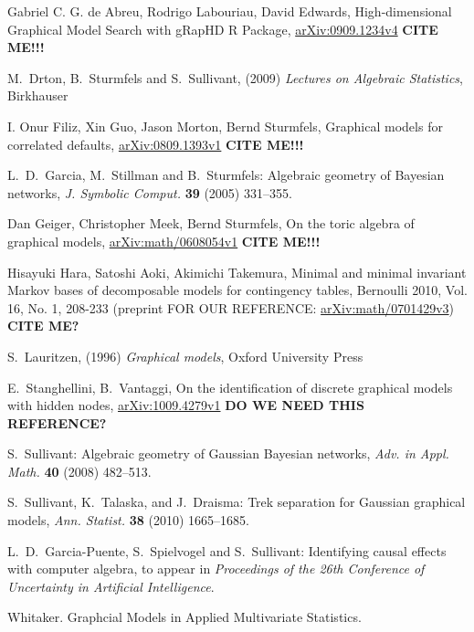 \documentclass[letterpaper]{article}
\theoremstyle{definition}
\begin{document}
\begin{thebibliography}{20}

Gabriel C. G. de Abreu, Rodrigo Labouriau, David Edwards, High-dimensional Graphical Model Search with gRapHD R Package, \href{http://arxiv.org/abs/0909.1234}{arXiv:0909.1234v4}
{\bf CITE ME!!!}

M.~Drton, B.~Sturmfels and S.~Sullivant, (2009) \emph{Lectures on Algebraic Statistics}, Birkhauser 

I. Onur Filiz, Xin Guo, Jason Morton, Bernd Sturmfels, Graphical models for correlated defaults, \href{http://arxiv.org/abs/0809.1393}{arXiv:0809.1393v1}
{\bf CITE ME!!!}

 L.~D.~Garcia, M.~Stillman and B.~Sturmfels: Algebraic geometry of Bayesian networks, {\em J. Symbolic Comput.}
  {\bf 39} (2005) 331--355.
  
Dan Geiger, Christopher Meek, Bernd Sturmfels, On the toric algebra of graphical models, \href{http://arxiv.org/abs/math/0608054}{arXiv:math/0608054v1}
{\bf CITE ME!!!}

Hisayuki Hara, Satoshi Aoki, Akimichi Takemura, Minimal and minimal invariant Markov bases of decomposable models for contingency tables, Bernoulli 2010, Vol. 16, No. 1, 208-233  (preprint FOR OUR REFERENCE: \href{http://arxiv.org/abs/math/0701429}{arXiv:math/0701429v3})
{\bf CITE ME?}

S.~Lauritzen,  (1996) \emph{Graphical models}, Oxford University Press

E.~Stanghellini, B.~Vantaggi, On the identification of discrete graphical models with hidden nodes, \href{http://arxiv.org/abs/1009.4279}{	arXiv:1009.4279v1}
{\bf DO WE NEED THIS REFERENCE?}

 S.~Sullivant: Algebraic geometry of Gaussian Bayesian
  networks, {\em Adv. in Appl. Math.} {\bf 40} (2008) 482--513.

S.~Sullivant, K.~Talaska, and J.~Draisma: Trek separation for Gaussian
graphical models, {\em Ann. Statist.} {\bf 38} (2010) 1665--1685. 

 L.~D.~Garcia-Puente, S.~Spielvogel and S.~Sullivant: Identifying
causal effects with computer algebra, to appear in {\em Proceedings of the 26th
Conference of Uncertainty in Artificial Intelligence}.

  Whitaker.  Graphcial Models in Applied Multivariate Statistics.

\end{thebibliography}
\end{document}
